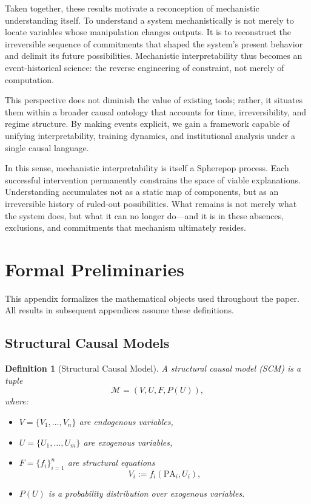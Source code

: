 \documentclass[11pt]{article}
\newtheorem{definition}{Definition}
\theoremstyle{remark}
\begin{document}
Taken together, these results motivate a reconception of mechanistic
understanding itself. To understand a system mechanistically is not
merely to locate variables whose manipulation changes outputs. It is
to reconstruct the irreversible sequence of commitments that shaped
the system’s present behavior and delimit its future possibilities.
Mechanistic interpretability thus becomes an event-historical science:
the reverse engineering of constraint, not merely of computation.

This perspective does not diminish the value of existing tools; rather,
it situates them within a broader causal ontology that accounts for
time, irreversibility, and regime structure. By making events explicit,
we gain a framework capable of unifying interpretability, training
dynamics, and institutional analysis under a single causal language.

In this sense, mechanistic interpretability is itself a Spherepop
process. Each successful intervention permanently constrains the space
of viable explanations. Understanding accumulates not as a static map
of components, but as an irreversible history of ruled-out
possibilities. What remains is not merely what the system does, but
what it can no longer do—and it is in these absences, exclusions, and
commitments that mechanism ultimately resides.

\appendix

\section{Formal Preliminaries}

This appendix formalizes the mathematical objects used throughout the
paper. All results in subsequent appendices assume these definitions.

\subsection{Structural Causal Models}

\begin{definition}[Structural Causal Model]
A structural causal model (SCM) is a tuple
\[
\mathcal{M} = (V, U, F, P(U)),
\]
where:
\begin{itemize}
\item $V = \{V_1, \ldots, V_n\}$ are endogenous variables,
\item $U = \{U_1, \ldots, U_m\}$ are exogenous variables,
\item $F = \{f_i\}_{i=1}^n$ are structural equations
\[
V_i := f_i(\mathrm{PA}_i, U_i),
\]
\item $P(U)$ is a probability distribution over exogenous variables.
\end{itemize}
\end{definition}
\end{document}
